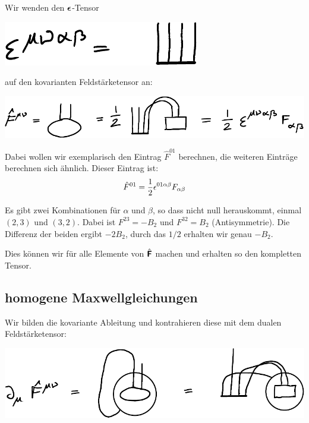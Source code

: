 Wir wenden den $\boldsymbol{\mathsf{\epsilon}}$-Tensor
\begin{center}
	\includegraphics{H1-Penrose-4-crop.pdf}
\end{center}
auf den kovarianten Feldstärketensor an:
\begin{center}
	\includegraphics{H1-Penrose-3-crop.pdf}
\end{center}

Dabei wollen wir exemplarisch den Eintrag $\hat F^{01}$ berechnen, die weiteren
Einträge berechnen sich ähnlich. Dieser Eintrag ist:
\[
	\hat F^{01} = \frac 12 \epsilon^{01\alpha\beta} F_{\alpha\beta}
\]

Es gibt zwei Kombinationen für $\alpha$ und $\beta$, so dass nicht null
herauskommt, einmal $(2, 3)$ und $(3, 2)$. Dabei ist $F^{23} = -B_2$ und
$F^{32} = B_2$ (Antisymmetrie). Die Differenz der beiden ergibt $-2 B_2$, durch
das $1/2$ erhalten wir genau $-B_2$.

Dies können wir für alle Elemente von $\hat{\boldsymbol{\mathsf{F}}}$ machen und erhalten so
den kompletten Tensor.

\subsection{homogene Maxwellgleichungen}

Wir bilden die kovariante Ableitung und kontrahieren diese mit dem dualen
Feldstärketensor:
\begin{center}
	\includegraphics{H1-Penrose-6-crop.pdf}
\end{center}

